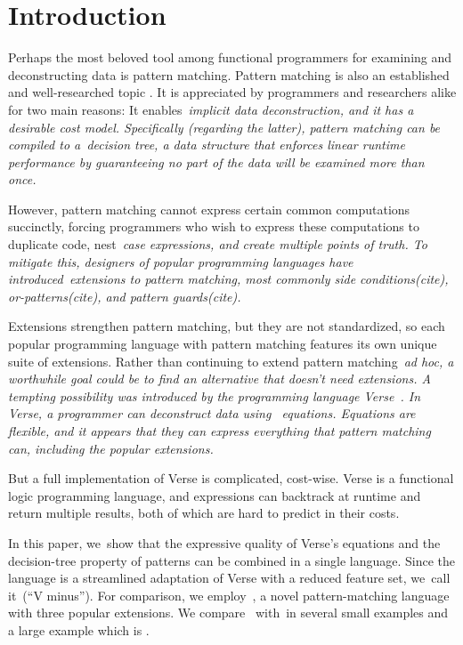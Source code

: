 \documentclass[article,screen,12pt, nonacm]{acmart}
\begin{document}
\section{Introduction}

Perhaps the most beloved tool among functional programmers for examining and
deconstructing data is pattern matching. 
Pattern matching is also an established and well-researched topic
\citep{wadler1987views, macqueen1985tree, burton1993pattern, palao1996new,
maranget, bpc}. It is appreciated by programmers and researchers alike for two
main reasons: It enables~\it{implicit} data deconstruction, and it has a
desirable cost model. Specifically (regarding the latter), pattern matching can
be compiled to a~\it{decision tree}, a data structure that enforces linear
runtime performance by guaranteeing no part of the data will be examined more
than once.~\citep{maranget}

However, pattern matching cannot express certain common computations succinctly,
forcing programmers who wish to express these computations to duplicate code,
nest~\it{case} expressions, and create multiple points of truth. To mitigate
this, designers of popular programming languages have introduced~\it{extensions}
to pattern matching, most commonly \textit{side conditions}(cite),
\textit{or-patterns}(cite), and \textit{pattern guards}(cite).

Extensions strengthen pattern matching, but they are not standardized, so each
popular programming language with pattern matching features its own unique suite
of extensions. Rather than continuing to extend pattern
matching~\it{ad hoc}, a worthwhile goal could be to find an alternative that
doesn't need extensions. A tempting possibility was introduced by the
programming language Verse~\citep{verse}. In Verse, a programmer can deconstruct
data using ~\it{equations}. Equations are flexible, and it appears that they can express everything that
pattern matching can, including the popular extensions. 

But a full implementation of Verse is complicated, cost-wise. Verse is a
functional logic programming language, and expressions can backtrack at runtime
and return multiple results, both of which are hard to predict in their costs. 


In this paper, we~show that the expressive quality of Verse's equations and the
decision-tree property of patterns can be combined in a single language. Since
the language is a streamlined adaptation of Verse with a reduced feature set,
we~call it~\VMinus (“V minus”). For comparison, we employ~\PPlus, a novel
pattern-matching language with three popular extensions. We compare~\VMinus
with~\PPlus in several small examples and a large example which is \padlexample. 
\end{document}
